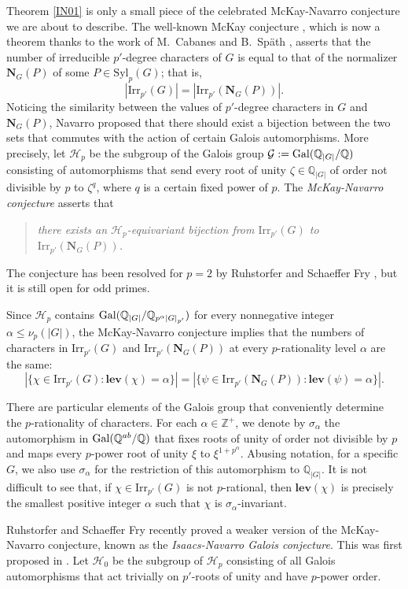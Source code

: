 \documentclass[12pt]{amsart}
\theoremstyle{definition}
\numberwithin{equation}{section}
\newcommand{\Irr}{{\mathrm {Irr}}}
\newcommand{\Syl}{{\mathrm {Syl}}}
\newcommand{\Gal}{{\rm Gal}}
\newcommand{\QQ}{{\mathbb Q}}
\newcommand{\ZZ}{{\mathbb Z}}
\newcommand{\lev}{\mathrm{\mathbf{lev}}}
\newcommand{\bN}{{\mathbf{N}}}
\begin{document}
Theorem \ref{IN01} is only a small piece of the celebrated
McKay-Navarro conjecture we are about to describe. The well-known
McKay conjecture \cite{McKay}, which is now a theorem thanks to the
work of M.~Cabanes and B.~Sp\"{a}th \cite{CS24}, asserts that the
number of irreducible $p'$-degree characters of $G$ is equal to that
of the normalizer $\bN_G(P)$ of some $P\in\Syl_p(G)$; that is,
\[
|\Irr_{p'}(G)|=|\Irr_{p'}(\bN_G(P))|.
\]
Noticing the similarity between the values of $p'$-degree characters
in $G$ and $\bN_G(P)$, Navarro \cite{Navarro04} proposed that there
should exist a bijection between the two sets that commutes with the
action of certain Galois automorphisms. More precisely, let
$\mathcal{H}_p$ be the subgroup of the Galois group
$\mathcal{G}:=\Gal(\QQ_{|G|}/\QQ)$ consisting of automorphisms that
send every root of unity $\zeta\in\QQ_{|G|}$ of order not divisible
by $p$ to $\zeta^{q}$, where $q$ is a certain fixed power of $p$.
The \emph{McKay-Navarro conjecture} asserts that
\begin{quote}
\emph{there exists an $\mathcal{H}_p$-equivariant bijection from
$\Irr_{p'}(G)$ to $\Irr_{p'}(\bN_G(P))$.}
\end{quote}
The conjecture has been resolved for $p=2$ by Ruhstorfer and
Schaeffer Fry \cite{RS25a}, but it is still open for odd primes.

Since $\mathcal{H}_p$ contains
$\Gal(\QQ_{|G|}/\QQ_{p^\alpha|G|_{p'}})$ for every nonnegative
integer $\alpha\le \nu_p(|G|)$, the McKay-Navarro conjecture implies
that the numbers of characters in $\Irr_{p'}(G)$ and
$\Irr_{p'}(\bN_G(P))$ at every $p$-rationality level $\alpha$ are
the same:
\[
|\{\chi\in\Irr_{p'}(G): \lev(\chi)=
\alpha\}|=|\{\psi\in\Irr_{p'}(\bN_G(P)): \lev(\psi)= \alpha\}|.
\]


There are particular elements of the Galois group that conveniently
determine the $p$-rationality of characters. For each
$\alpha\in\ZZ^{+}$, we denote by $\sigma_{\alpha}$ the automorphism
in $\Gal(\QQ^{ab}/\QQ)$ that fixes roots of unity of order not
divisible by $p$ and maps every $p$-power root of unity $\xi$ to
$\xi^{1+p^\alpha}$. Abusing notation, for a specific $G$, we also
use $\sigma_{\alpha}$ for the restriction of this automorphism to
$\QQ_{|G|}$. It is not difficult to see that, if
$\chi\in\Irr_{p'}(G)$ is not $p$-rational, then $\lev(\chi)$ is
precisely the smallest positive integer $\alpha$ such that $\chi$ is
$\sigma_{\alpha}$-invariant.

Ruhstorfer and Schaeffer Fry \cite{RS25} recently proved a weaker
version of the McKay-Navarro conjecture, known as the
\emph{Isaacs-Navarro Galois conjecture}. This was first proposed in
\cite{Isaacs-Navarro02}. Let $\mathcal{H}_0$ be the subgroup of
$\mathcal{H}_p$ consisting of all Galois automorphisms that act
trivially on $p'$-roots of unity and have $p$-power order.
\end{document}
